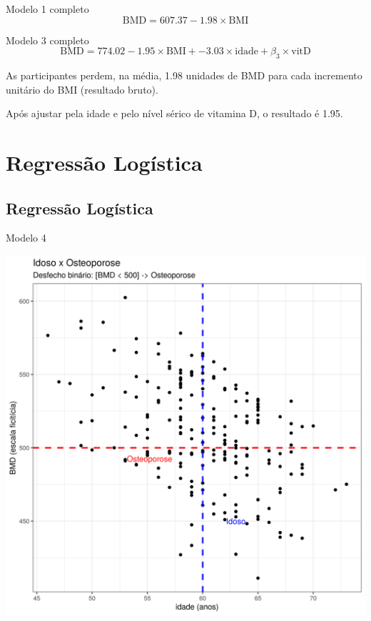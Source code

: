 \documentclass{beamer}
\begin{document}
\begin{frame}{\scriptsize }
  \begin{exampleblock}{Modelo 1 completo}
    \tiny
    \begin{displaymath}
      \text{BMD} =607.37 -1.98 \times\text{BMI}
    \end{displaymath}
  \end{exampleblock}
  \begin{exampleblock}{Modelo 3 completo}
    \footnotesize
    \begin{displaymath}
      \text{BMD} =774.02 -1.95 \times\text{BMI} + -3.03 \times\text{idade} + \beta_3 \times\text{vitD}
    \end{displaymath}
  \end{exampleblock}
  \begin{block}{}
    \footnotesize
    As participantes perdem, na média, 1.98 unidades de BMD para cada incremento unitário do BMI (resultado bruto).

    \bigskip
    Após ajustar pela idade e pelo nível sérico de vitamina D, o resultado é 1.95.
  \end{block}
\end{frame}

\section{Regressão Logística}

\subsection{Regressão Logística}

\begin{frame}{\scriptsize Modelo 4}
  \begin{center}
    \includegraphics[height=.9\textheight]{Cap31-32/pratica-glm4}
  \end{center}
\end{frame}
\end{document}
